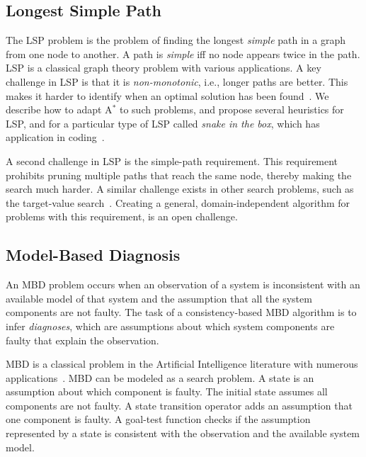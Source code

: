 \documentclass{article}
\newcommand{\lsp}{\ac{LSP}\xspace}
\newcommand{\astar}{A$^*$\xspace}
\newcommand{\mbd}{\ac{MBD}\xspace}
\begin{document}





\subsection{Longest Simple Path}
The \lsp problem is the problem of finding the longest \emph{simple} path in a graph from one node to another. A path is \emph{simple} iff no node appears twice in the path. \lsp is a classical graph theory problem with various applications. A key challenge in \lsp is that it is \emph{non-monotonic}, i.e., longer paths are better. This makes it harder to identify when an optimal solution has been found~\cite{SternFBPSG14}. We describe how to adapt \astar to such problems, and propose several heuristics for \lsp, and for a particular type of \lsp called \emph{snake in the box}, which has application in coding~\cite{palombo2015solving}.  

A second challenge in \lsp is the simple-path requirement. This requirement prohibits pruning multiple paths that reach the same node, thereby making the search much harder. A similar challenge exists in other search problems, such as the target-value search~\cite{lopez2013target}. Creating a general, domain-independent algorithm for problems with this requirement, is an open challenge. 


\subsection{Model-Based Diagnosis}
An \mbd  problem occurs when an observation of a system is inconsistent with an available model of that system and the assumption that all the system components are not faulty. The task of a consistency-based \mbd algorithm is to infer \emph{diagnoses}, which are 
assumptions about which system components are faulty that explain the observation. 


\mbd is a classical problem in the Artificial Intelligence literature with numerous applications~\cite{reiter1987theory,de1987diagnosing}. \mbd can be modeled as a search problem. A state is an assumption about which component is faulty. The initial state assumes all components are not faulty. 
A state transition operator adds an assumption that one component is faulty. A goal-test function checks if the assumption represented by a state is consistent with the observation and the available system model. 
\end{document}
